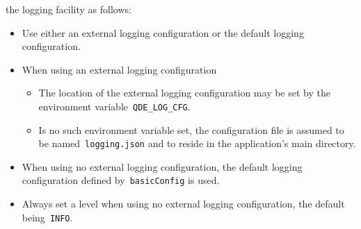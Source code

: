 \documentclass[%
    a4paper,    %
    justified,  %
    nobib,      %
    openany     %
]{tufte-book}
\begin{document}
 the logging facility as
follows:
\begin{itemize}
  \item Use either an external logging configuration or the default logging
        configuration.
  \item When using an external logging configuration
    \begin{itemize}
      \item The location of the external logging configuration may be set by the
            environment variable~\verb=QDE_LOG_CFG=.
      \item Is no such environment variable set, the configuration file is
            assumed to be named~\verb=logging.json= and to reside in the
            application's main directory.
    \end{itemize}
  \item When using no external logging configuration, the default logging
        configuration defined by~\verb=basicConfig= is used.
  \item Always set a level when using no external logging configuration, the
        default being~\verb=INFO=.
\end{itemize}
\end{document}
